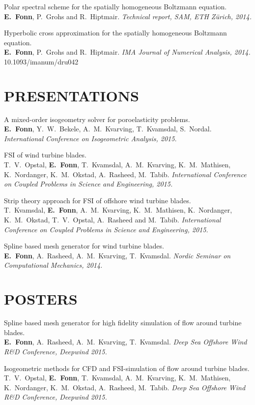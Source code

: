 \documentclass[line,margin]{res}
\newcommand{\zh}{Z\"{u}rich}
\begin{document}
\begin{resume}
Polar spectral scheme for the spatially homogeneous Boltzmann equation. \\
{\bf E.~Fonn}, P.~Grohs and R.~Hiptmair.
{\em Technical report, SAM, ETH \zh, 2014.}

Hyperbolic cross approximation for the spatially homogeneous Boltzmann equation. \\
{\bf E.~Fonn}, P.~Grohs and R.~Hiptmair.
{\em IMA Journal of Numerical Analysis, 2014.} \\
10.1093/imanum/dru042


\section{PRESENTATIONS}

A mixed-order isogeometry solver for poroelasticity problems. \\
{\bf E.~Fonn}, Y.~W.~Bekele, A.~M.~Kvarving, T.~Kvamsdal, S.~Nordal.
{\em {} International Conference on Isogeometric Analysis, 2015.}

FSI of wind turbine blades. \\
T.~V.~Opstal, {\bf E.~Fonn}, T.~Kvamsdal, A.~M.~Kvarving, K.~M.~Mathisen,
K.~Nordanger, K.~M.~Okstad, A.~Rasheed, M.~Tabib.
{\em {} International Conference on Coupled Problems in Science and Engineering, 2015.}

Strip theory approach for FSI of offshore wind turbine blades. \\
T.~Kvamsdal, {\bf E.~Fonn}, A.~M.~Kvarving, K.~M.~Mathisen, K.~Nordanger,
K.~M.~Okstad, T.~V.~Opstal, A.~Rasheed and M.~Tabib.
{\em {} International Conference on Coupled Problems in Science and Engineering, 2015.}

Spline based mesh generator for wind turbine blades. \\
{\bf E.~Fonn}, A.~Rasheed, A.~M.~Kvarving, T.~Kvamsdal.
{\em {} Nordic Seminar on Computational Mechanics, 2014.}


\section{POSTERS}

Spline based mesh generator for high fidelity simulation of flow around turbine blades. \\
{\bf E.~Fonn}, A.~Rasheed, A.~M.~Kvarving, T.~Kvamsdal.
{\em {} Deep Sea Offshore Wind R\&D Conference, Deepwind 2015.}

Isogeometric methods for CFD and FSI-simulation of flow around turbine blades. \\
T.~V.~Opstal, {\bf E.~Fonn}, T.~Kvamsdal, A.~M.~Kvarving, K.~M.~Mathisen,
K.~Nordanger, K.~M.~Okstad, A.~Rasheed, M.~Tabib.
{\em {} Deep Sea Offshore Wind R\&D Conference, Deepwind 2015.}


\end{resume}
\end{document}

